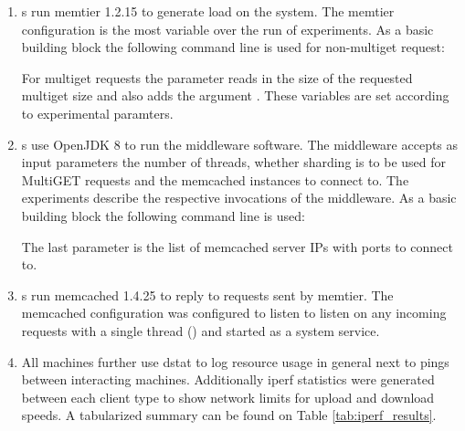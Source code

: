         \begin{enumerate}
            \item \cli{}s run memtier 1.2.15 %
                  to generate load on the system.
                  The memtier configuration is the most variable over the run of experiments. As a basic building
                  block the following command line is used for non-multiget request:

                  For multiget requests the  parameter reads in the size of the requested multiget
                  size and also adds the argument . These variables are set
                  according to experimental paramters.

              \item \mw{}s use OpenJDK 8 to run the middleware software.
                  The middleware accepts as input parameters the number of threads, whether sharding is to be used
                  for MultiGET requests and the memcached instances to connect to. The experiments describe the
                  respective invocations of the middleware. As a basic building block the following command line is
                  used:

                   The last parameter is the list of memcached server IPs with ports to connect to.

               \item \srv{}s run memcached 1.4.25 to reply to requests sent by memtier.
                  The memcached configuration was configured to listen to listen on any incoming requests with a
                  single thread () and started as a system service.

            \item All machines further use dstat to log resource usage in general next to pings between interacting
                  machines. Additionally iperf statistics were generated between each client type to show network
                  limits for upload and download speeds. A tabularized summary can be found on Table
                  \ref{tab:iperf_results}.
        \end{enumerate}

